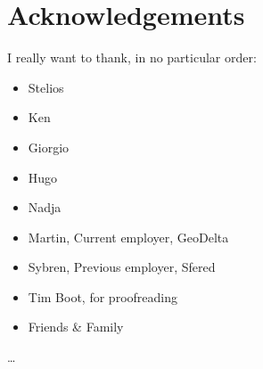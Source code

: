 
\chapter*{Acknowledgements}
I really want to thank, in no particular order:
\begin{itemize}
    \item Stelios
    \item Ken
    \item Giorgio
    \item Hugo
    \item Nadja
    \item Martin, Current employer, GeoDelta 
    \item Sybren, Previous employer, Sfered
    \item Tim Boot, for proofreading
    \item Friends \& Family
\end{itemize}

\ldots



 